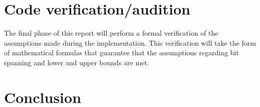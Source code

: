 \documentclass[twocolumn]{article}
\begin{document}
\section{Code verification/audition}
The final phase of this report will perform a formal verification of the assumptions made during the implementation. This verification will take the form of
mathematical formulas that guarantee that the assumptions regarding bit spanning and lower and upper bounds are met.

\section{Conclusion}

\printbibliography

\onecolumn
\begin{appendices}
\end{appendices}
\end{document}
